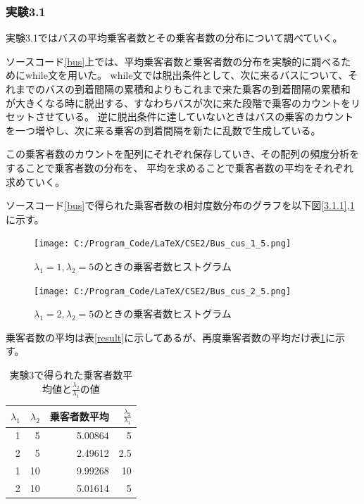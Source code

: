 \documentclass[a4paper,11pt,dvipdfmx]{jsarticle}
\begin{document}
\subsubsection{実験3.1}
実験3.1ではバスの平均乗客者数とその乗客者数の分布について調べていく。

ソースコード\ref{bus}上では、平均乗客者数と乗客者数の分布を実験的に調べるためにwhile文を用いた。
while文では脱出条件として、次に来るバスについて、それまでのバスの到着間隔の累積和よりもこれまで来た乗客の到着間隔の累積和
が大きくなる時に脱出する、すなわちバスが次に来た段階で乗客のカウントをリセットさせている。
逆に脱出条件に達していないときはバスの乗客のカウントを一つ増やし、次に来る乗客の到着間隔を新たに乱数で生成している。

この乗客者数のカウントを配列にそれぞれ保存していき、その配列の頻度分析をすることで乗客者数の分布を、
平均を求めることで乗客者数の平均をそれぞれ求めていく。

ソースコード\ref{bus}で得られた乗客者数の相対度数分布のグラフを以下図\ref{3.1.1},\ref{3.1.2}に示す。
\begin{figure}[h]
    \begin{minipage}[b]{0.48\columnwidth}
      \centering
      \texttt{[image: C:/Program\_Code/LaTeX/CSE2/Bus\_cus\_1\_5.png]}
      \caption{$\lambda_1=1,\lambda_2=5$のときの乗客者数ヒストグラム}
      \label{3.1.1}
    \end{minipage}
    \hspace{0.04\columnwidth} 
    \begin{minipage}[b]{0.48\columnwidth}
      \centering
      \texttt{[image: C:/Program\_Code/LaTeX/CSE2/Bus\_cus\_2\_5.png]}
      \caption{$\lambda_1=2,\lambda_2=5$のときの乗客者数ヒストグラム}
      \label{3.1.2}
    \end{minipage}
\end{figure}

乗客者数の平均は表\ref{result}に示してあるが、再度乗客者数の平均だけ表\ref{result_1}に示す。
\begin{table}[ht]
    \centering
    \caption{実験3で得られた乗客者数平均値と$\frac{\lambda_2}{\lambda_1}$の値}
    \begin{tabular}{|r|r|r|r|} \hline
        $\lambda_1$ & $\lambda_2$ & 乗客者数平均 & $\frac{\lambda_2}{\lambda_1}$  \\ \hline
        1 & 5  & 5.00864 & 5   \\ \hline
        2 & 5  & 2.49612 & 2.5 \\ \hline
        1 & 10 & 9.99268 & 10  \\ \hline
        2 & 10 & 5.01614 & 5   \\ \hline
    \end{tabular}
    \label{result_1}
\end{table}
\end{document}
